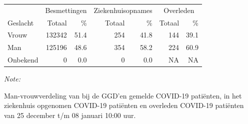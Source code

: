 \documentclass[
  english,
  man,floatsintext]{apa6}
\begin{document}
\begin{table}
\centering\begingroup\fontsize{11}{13}\selectfont

\begin{threeparttable}
\begin{tabular}{lrrrrrr}
\toprule
\multicolumn{1}{c}{ } & \multicolumn{2}{c}{Besmettingen} & \multicolumn{2}{c}{Ziekenhuisopnames} & \multicolumn{2}{c}{Overleden} \\
\cmidrule(l{3pt}r{3pt}){2-3} \cmidrule(l{3pt}r{3pt}){4-5} \cmidrule(l{3pt}r{3pt}){6-7}
Geslacht & Totaal & \% & Totaal & \% & Totaal & \%\\
\midrule
Vrouw & 132342 & 51.4 & 254 & 41.8 & 144 & 39.1\\
Man & 125196 & 48.6 & 354 & 58.2 & 224 & 60.9\\
Onbekend & 0 & 0.0 & 0 & 0.0 & NA & NA\\
\bottomrule
\end{tabular}
\begin{tablenotes}
\item \textit{Note: } 
\item Man-vrouwverdeling van bij de GGD’en gemelde COVID-19 patiënten, in het ziekenhuis opgenomen COVID-19 patiënten en overleden COVID-19 patiënten van 25 december t/m 08 januari 10:00 uur.
\end{tablenotes}
\end{threeparttable}
\endgroup{}
\end{table}
\newpage
\end{document}
